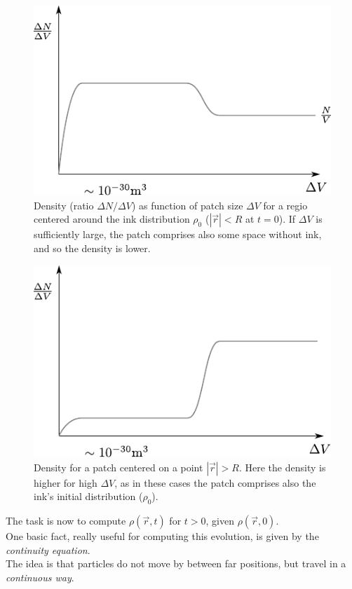 \documentclass[../template.tex]{subfiles}
\begin{document}
\begin{enumerate}
\begin{minipage}[t]{0.45\textwidth}
\begin{figure}[H]
\includegraphics[width=\textwidth]{Plots/patch_centered_ink.pdf}
\caption{Density (ratio $\Delta N/\Delta V$) as function of patch size $\Delta V$ for a regio centered around the ink distribution $\rho_0$ ($|\vec{r}|<R$ at $t=0$). If $\Delta V$ is sufficiently large, the patch comprises also some space without ink, and so the density is lower.}
\end{figure}
\end{minipage}\hfill%
\begin{minipage}[t]{0.45\textwidth}
\begin{figure}[H]
\includegraphics[width=\textwidth]{Plots/patch_centered_not_ink.pdf}
\caption{Density for a patch centered on a point $|\vec{r}|>R$. Here the density is higher for high $\Delta V$, as in these cases the patch comprises also the ink's initial distribution ($\rho_0$).}
\end{figure}
\end{minipage}
\end{enumerate}
The task is now to compute $\rho(\vec{r},t)$ for $t>0$, given $\rho(\vec{r},0)$.\\
One basic fact, really useful for computing this evolution, is given by the \textit{continuity equation}.\\
The idea is that particles do not move by  between far positions, but travel in a \textit{continuous way}.\\
\end{document}
